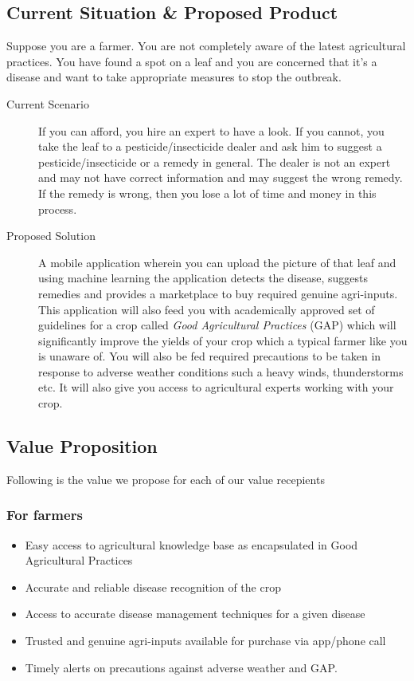 \documentclass[a4paper]{article}
\begin{document}
\subsection{Current Situation \& Proposed Product}
Suppose you are a farmer. You are not completely aware of the latest agricultural practices. You have found a spot on a leaf and you are concerned that it’s a disease and want to take appropriate measures to stop the outbreak. 
\begin{description}
\item[Current Scenario] If you can afford, you hire an expert to have a look. If you cannot, you take the leaf to a pesticide/insecticide dealer and ask him to suggest a pesticide/insecticide or a remedy in general. The dealer is not an expert and may not have correct information and may suggest the wrong remedy. If the remedy is wrong, then you lose a lot of time and money in this process.

\item[Proposed Solution] A mobile application wherein you can upload the picture of that leaf and using machine learning the application detects the disease, suggests remedies and provides a marketplace to buy required genuine agri-inputs. 
This application will also feed you with academically approved set of guidelines for a crop called \emph{Good Agricultural Practices} (GAP) which will significantly improve the yields of your crop which a typical farmer like you is unaware of.
You will also be fed required precautions to be taken in response to adverse weather conditions such a heavy winds, thunderstorms etc.
It will also give you access to agricultural experts working with your crop.

\end{description}

\subsection{Value Proposition}
Following is the value we propose for each of our value recepients
\subsubsection{For farmers}
\begin{itemize}
\item Easy access to agricultural knowledge base as encapsulated in Good Agricultural Practices 
\item Accurate and reliable disease recognition of the crop
\item Access to accurate disease management techniques for a given disease
\item Trusted and genuine agri-inputs available for purchase via app/phone call
\item Timely alerts on precautions against adverse weather and GAP.
\end{itemize}
\end{document}
